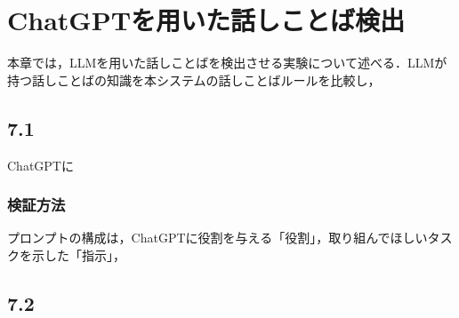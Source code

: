 \chapter{ChatGPTを用いた話しことば検出 \label{c7}}

本章では，LLMを用いた話しことばを検出させる実験について述べる．LLMが持つ話しことばの知識を本システムの話しことばルールを比較し，
\begin{comment}
書きことばリストは、話しことばチェッカーで検出しない表現をもとに選んでいる。
それでもchatGPTが出力する場合は、チェッカーの癖もあり得る。← これは要相談
\end{comment}
\section{7.1 \label{c7s1}}
ChatGPTに

\subsection{検証方法}
プロンプトの構成は，ChatGPTに役割を与える「役割」，取り組んでほしいタスクを示した「指示」，

\section{7.2 \label{c7s2}}
